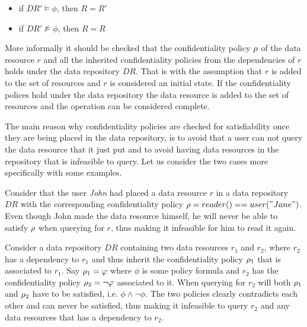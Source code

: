 \begin{itemize}
    \item if $DR' \models \phi$, then $R = R'$
    \item if $DR' \not\models \phi$, then $R = R$
\end{itemize}
More informally it should be checked that the confidentiality policy $\rho$ of the data resource $r$ and all the inherited confidentiality policies from the dependencies of $r$ holds under the data repository $DR$. That is with the assumption that $r$ is added to the set of resources and $r$ is considered an initial state. If the confidentiality polices hold under the data repository the data resource is added to the set of resources and the operation can be considered complete.

The main reason why confidentiality policies are checked for satisfiability once they are being placed in the data repository, is to avoid that a user can not query the data resource that it just put and to avoid having data resources in the repository that is infeasible to query. Let us consider the two cases more specifically with some examples.

\begin{example}
Consider that the user \emph{John} had placed a data resource $r$ in a data repository $DR$ with the corresponding confidentiality policy $\rho = reader() == user("Jane")$. Even though John made the data resource himself, he will never be able to satisfy $\rho$ when querying for $r$, thus making it infeasible for him to read it again.
\end{example}

\begin{example}
Consider a data repository $DR$ containing two data resources $r_1$ and $r_2$, where $r_2$ has a dependency to $r_1$ and thus inherit the confidentiality policy $\rho_1$ that is associated to $r_1$. Say $\rho_1 = \varphi$ where $\phi$ is some policy formula and $r_2$ has the confidentiality policy $\rho_2 = \lnot \varphi$ associated to it. When querying for $r_2$ will both $\rho_1$ and $\rho_2$ have to be satisfied, i.e. $\phi \land \lnot \phi$. The two policies clearly contradicts each other and can never be satisfied, thus making it infeasible to query $r_2$ and any data resources that has a dependency to $r_2$.
\end{example}

